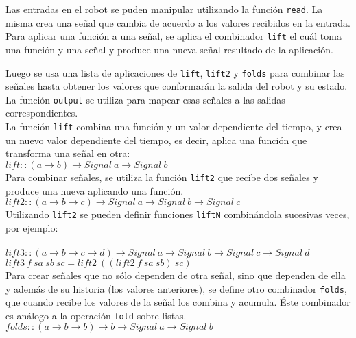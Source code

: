   Las entradas en el robot se puden manipular utilizando la función \texttt{read}.
  La misma crea una señal que cambia de acuerdo a los valores recibidos en la entrada.\\

  Para aplicar una función a una señal, se aplica el combinador \texttt{lift} el cuál toma
  una función y una señal y produce una nueva señal resultado de la aplicación.

  Luego se usa una lista de aplicaciones de \texttt{lift},
\texttt{lift2} y \texttt{folds} para combinar las señales hasta
obtener los valores que conformarán la salida del robot y su estado.\\
  La función \texttt{output} se utiliza para mapear esas señales a las
salidas correspondientes.\\

  La función \texttt{lift} combina una función y un valor
dependiente del tiempo, y crea un nuevo valor dependiente
del tiempo, es decir, aplica una función que transforma
una señal en otra:\\

$lift :: (a \rightarrow b) \rightarrow Signal\ a \rightarrow Signal\ b$\\

  Para combinar señales, se utiliza la función \texttt{lift2}
que recibe dos señales y produce una nueva aplicando una
función.\\

$lift2 :: (a \rightarrow b \rightarrow c) \rightarrow Signal\ a \rightarrow Signal\ b \rightarrow Signal\ c$\\

Utilizando \texttt{lift2} se pueden definir funciones \texttt{liftN}
combinándola sucesivas veces, por ejemplo:\\
\\
$lift3 :: (a \rightarrow b \rightarrow c \rightarrow d) \rightarrow Signal\ a \rightarrow Signal\ b \rightarrow Signal\ c \rightarrow Signal\ d$\\
$lift3\ f\ sa\ sb\ sc = lift2\ ((lift2\ f\ sa\ sb)\ sc)$\\

  Para crear señales que no sólo dependen de otra señal, sino que dependen
de ella y además de su historia (los valores anteriores),
se define otro combinador \texttt{folds},
que cuando recibe los valores de la señal los combina y acumula. Éste
combinador es análogo a la operación \texttt{fold} sobre listas.\\

$folds :: (a \rightarrow b \rightarrow b) \rightarrow b \rightarrow Signal\ a \rightarrow Signal\ b$\\


